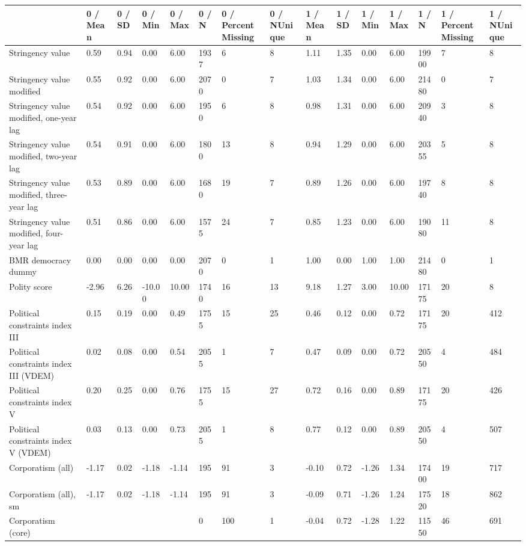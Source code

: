 
\begin{longtable}{lllllllllllllll}
\toprule
  & 0 / Mean & 0 / SD & 0 / Min & 0 / Max & 0 / N & 0 / PercentMissing & 0 / NUnique & 1 / Mean & 1 / SD & 1 / Min & 1 / Max & 1 / N & 1 / PercentMissing & 1 / NUnique\\
\midrule
Stringency value & 0.59 & 0.94 & 0.00 & 6.00 & 1937 & 6 & 8 & 1.11 & 1.35 & 0.00 & 6.00 & 19900 & 7 & 8\\
Stringency value modified & 0.55 & 0.92 & 0.00 & 6.00 & 2070 & 0 & 7 & 1.03 & 1.34 & 0.00 & 6.00 & 21480 & 0 & 7\\
Stringency value modified, one-year lag & 0.54 & 0.92 & 0.00 & 6.00 & 1950 & 6 & 8 & 0.98 & 1.31 & 0.00 & 6.00 & 20940 & 3 & 8\\
Stringency value modified, two-year lag & 0.54 & 0.91 & 0.00 & 6.00 & 1800 & 13 & 8 & 0.94 & 1.29 & 0.00 & 6.00 & 20355 & 5 & 8\\
Stringency value modified, three-year lag & 0.53 & 0.89 & 0.00 & 6.00 & 1680 & 19 & 7 & 0.89 & 1.26 & 0.00 & 6.00 & 19740 & 8 & 8\\
\addlinespace
Stringency value modified, four-year lag & 0.51 & 0.86 & 0.00 & 6.00 & 1575 & 24 & 7 & 0.85 & 1.23 & 0.00 & 6.00 & 19080 & 11 & 8\\
BMR democracy dummy & 0.00 & 0.00 & 0.00 & 0.00 & 2070 & 0 & 1 & 1.00 & 0.00 & 1.00 & 1.00 & 21480 & 0 & 1\\
Polity score & -2.96 & 6.26 & -10.00 & 10.00 & 1740 & 16 & 13 & 9.18 & 1.27 & 3.00 & 10.00 & 17175 & 20 & 8\\
Political constraints index III & 0.15 & 0.19 & 0.00 & 0.49 & 1755 & 15 & 25 & 0.46 & 0.12 & 0.00 & 0.72 & 17175 & 20 & 412\\
Political constraints index III (VDEM) & 0.02 & 0.08 & 0.00 & 0.54 & 2055 & 1 & 7 & 0.47 & 0.09 & 0.00 & 0.72 & 20550 & 4 & 484\\
\addlinespace
Political constraints index V & 0.20 & 0.25 & 0.00 & 0.76 & 1755 & 15 & 27 & 0.72 & 0.16 & 0.00 & 0.89 & 17175 & 20 & 426\\
Political constraints index V (VDEM) & 0.03 & 0.13 & 0.00 & 0.73 & 2055 & 1 & 8 & 0.77 & 0.12 & 0.00 & 0.89 & 20550 & 4 & 507\\
Corporatism (all) & -1.17 & 0.02 & -1.18 & -1.14 & 195 & 91 & 3 & -0.10 & 0.72 & -1.26 & 1.34 & 17400 & 19 & 717\\
Corporatism (all), sm & -1.17 & 0.02 & -1.18 & -1.14 & 195 & 91 & 3 & -0.09 & 0.71 & -1.26 & 1.24 & 17520 & 18 & 862\\
Corporatism (core) &  &  &  &  & 0 & 100 & 1 & -0.04 & 0.72 & -1.28 & 1.22 & 11550 & 46 & 691\\

\end{longtable}
